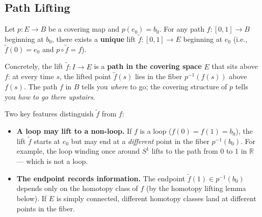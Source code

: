 \documentclass[11pt]{report}
\begin{document}
\subsection{Path Lifting}

\begin{lembox}
Let $p: E \to B$ be a covering map and $p(e_0) = b_0$. For any path $f: [0,1] \to B$ beginning at $b_0$, there exists a \textbf{unique} lift $\tilde{f}: [0,1] \to E$ beginning at $e_0$ (i.e., $\tilde{f}(0) = e_0$ and $p \circ \tilde{f} = f$).
\end{lembox}

\begin{rembox}
Concretely, the lift $\tilde{f}: I \to E$ is a \textbf{path in the covering space} $E$ that sits above $f$: at every time $s$, the lifted point $\tilde{f}(s)$ lies in the fiber $p^{-1}(f(s))$ above $f(s)$. The path $f$ in $B$ tells you \emph{where} to go; the covering structure of $p$ tells you \emph{how to go there upstairs}.

Two key features distinguish $\tilde{f}$ from $f$:
\begin{itemize}[nosep]
    \item \textbf{A loop may lift to a non-loop.} If $f$ is a loop ($f(0) = f(1) = b_0$), the lift $\tilde{f}$ starts at $e_0$ but may end at a \emph{different} point in the fiber $p^{-1}(b_0)$. For example, the loop winding once around $S^1$ lifts to the path from $0$ to $1$ in $\mathbb{R}$ --- which is not a loop.
    \item \textbf{The endpoint records information.} The endpoint $\tilde{f}(1) \in p^{-1}(b_0)$ depends only on the homotopy class of $f$ (by the homotopy lifting lemma below). If $E$ is simply connected, different homotopy classes land at different points in the fiber.
\end{itemize}
\end{rembox}
\end{document}
